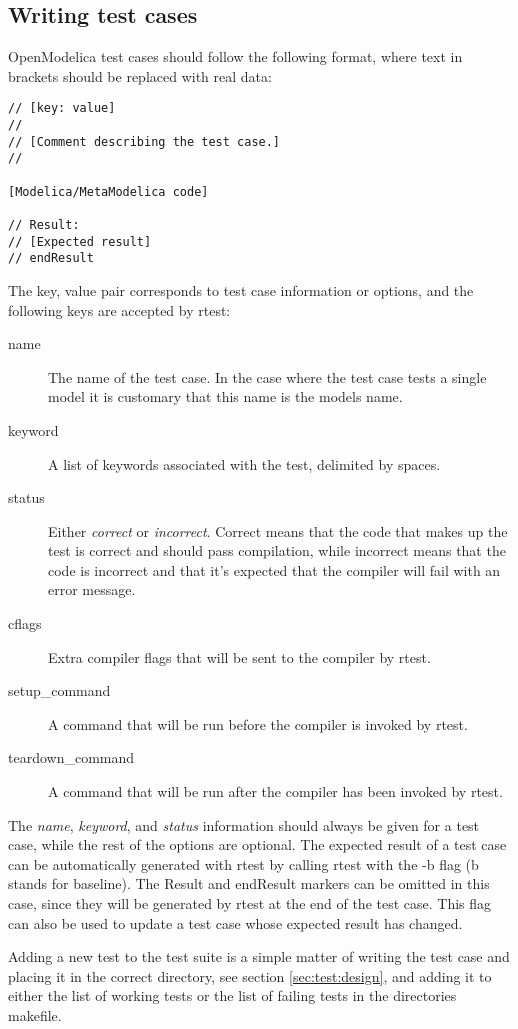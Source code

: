 \subsection{Writing test cases}
\label{sec:test:writing}
OpenModelica test cases should follow the following format, where text in
brackets should be replaced with real data:
\begin{lstlisting}[language=modelica]
// [key: value]
//
// [Comment describing the test case.]
//

[Modelica/MetaModelica code]

// Result:
// [Expected result]
// endResult
\end{lstlisting}
The key, value pair corresponds to test case information or options, and the
following keys are accepted by rtest:
\begin{description}
\item[name] The name of the test case. In the case where the test case tests a
single model it is customary that this name is the models name.
\item[keyword] A list of keywords associated with the test, delimited by spaces.
\item[status] Either \emph{correct} or \emph{incorrect}. Correct means that the
code that makes up the test is correct and should pass compilation, while
incorrect means that the code is incorrect and that it's expected that the
compiler will fail with an error message.
\item[cflags] Extra compiler flags that will be sent to the compiler by rtest.
\item[setup_command] A command that will be run before the compiler is invoked
by rtest.
\item[teardown_command] A command that will be run after the compiler has been
invoked by rtest.
\end{description}
The \emph{name}, \emph{keyword}, and \emph{status} information should always be
given for a test case, while the rest of the options are optional. The expected
result of a test case can be automatically generated with rtest by calling rtest
with the -b flag (b stands for baseline). The Result and endResult markers can
be omitted in this case, since they will be generated by rtest at the end of the
test case. This flag can also be used to update a test case whose expected
result has changed. 

Adding a new test to the test suite is a simple matter of writing the test case
and placing it in the correct directory, see section \ref{sec:test:design}, and
adding it to either the list of working tests or the list of failing tests in
the directories makefile.

